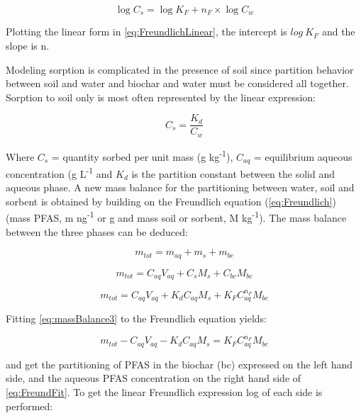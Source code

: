 \begin{equation} \label{eq:FreundlichLinear}
    \log C_s = \log K_F + n_F \times \log C_{w}
\end{equation}

Plotting the linear form in \cref{eq:FreundlichLinear}, the intercept is $log~K_F$ and the slope is n. 

Modeling sorption is complicated in the presence of soil since partition behavior between soil and water and biochar and water must be considered all together. Sorption to soil only is most often represented by the linear expression:

\begin{equation} \label{eq:KD}
    C_s = \frac{K_d}{C_{w}}
\end{equation}

Where $C_s$ = quantity sorbed per unit mass (\textmu g kg\textsuperscript{-1}), $C_{aq}$ =  equilibrium aqueous concentration (\textmu g L\textsuperscript{-1} and $K_d$ is the partition constant between the solid and aqueous phase. A new mass balance for the partitioning between water, soil and sorbent is obtained by building on the Freundlich equation (\cref{eq:Freundlich}) (mass PFAS, m ng\textsuperscript{-1} or \textmu g and mass soil or sorbent, M kg\textsuperscript{-1}). The mass balance between the three phases can be deduced:

\begin{equation} \label{eq:massBalance1}
    m_{tot} = m_{aq} + m_{s} + m_{bc}
\end{equation}

\begin{equation} \label{eq:massBalance2}
     m_{tot} = C_{aq}V_{aq} + C_sM_s + C_{bc}M_{bc}
\end{equation}

\begin{equation} \label{eq:massBalance3}
     m_{tot} = C_{aq}V_{aq} + K_dC_{aq}M_s + K_{F}C_{aq}^{n_F}M_{bc}
\end{equation}
 
Fitting \cref{eq:massBalance3} to the Freundlich equation yields:

\begin{equation} \label{eq:FreundFit}
    m_{tot} - C_{aq}V_{aq} - K_dC_{aq}M_s = K_{F}C_{aq}^{n_F}M_{bc}
\end{equation}

and get the partitioning of PFAS in the biochar (bc) expressed on the left hand side, and the aqueous PFAS concentration on the right hand side of \cref{eq:FreundFit}. To get the linear Freundlich expression log of each side is performed:

